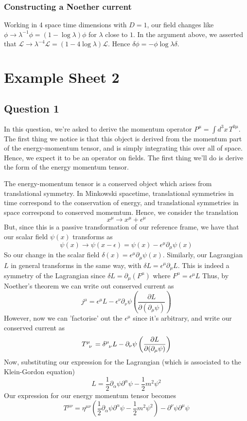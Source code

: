\documentclass[11pt, oneside]{article}   	%
\theoremstyle{newline}
\theoremstyle{newline}
\theoremstyle{newline}
\theoremstyle{newline}
\theoremstyle{newline}
\begin{document}
\subsubsection*{Constructing a Noether current} 
Working in 4 space time dimensions with $D = 1$, our field changes like $\phi \rightarrow \lambda^{ -1} \phi  = ( 1 - \log \lambda ) \phi$ for $\lambda $ close to $1$. In the argument above, we asserted that $\mathcal{ L} \rightarrow \lambda^{ - 4} \mathcal{L }  = ( 1  - 4 \log \lambda ) \mathcal{ L} $.  
Hence $\delta \phi  =  - \phi  \log \lambda \delta $.  
\pagebreak 
\section{Example Sheet 2} 
\subsection{Question 1} 

In this question, we're asked to derive the momentum operator $P^\mu = \int d^3x \, T^{ 0 \mu} $. The first thing we notice is that this object is derived from the momentum part of the energy-momentum tensor, and is simply integrating this over all of space. Hence, we expect it to be an operator on fields. The first thing we'll do is derive the form of the energy momentum tensor. 

The energy-momentum tensor is a conserved object which arises from translational symmetry. In Minkowski spacetime, translational symmetries in time correspond to the conservation of energy, and translational symmetries in space correspond to conserved momemtum. Hence, we consider the translation \[ x^\mu \rightarrow x^\mu + \epsilon^\mu \] 
But, since this is a passive transformation of our reference frame, we have that our scalar field $\psi(x)$  transforms as \[ \psi(x) \rightarrow \psi(x - \epsilon) = \psi(x)  - \epsilon^\mu \partial_\mu \psi( x) \] 
So our change in the scalar field $\delta( x) = \epsilon^\mu\partial_\mu \psi(x) $. Similarly, our Lagrangian $L$ in general transforms in the same way, with $\delta L = \epsilon^\mu \partial_\mu L $. This is indeed a symmetry of the Lagrangian since $\delta L = \partial_\mu ( F^\mu ) $ where $F^\mu = \epsilon^\mu L $ Thus, by Noether's theorem we can write out conserved current as 
\[ j^\mu = \epsilon^\mu L - \epsilon^\nu \partial_\nu \psi \left( \frac{ \partial L }{\partial ( \partial_\mu \psi) } \right) \]    
However, now we can 'factorise' out the $\epsilon^\mu$ since it's arbitrary, and write our conserved current as \[ T\indices{^\mu_\nu}  = \delta\indices{^\mu_\nu} L  - \partial_\nu \psi \left( \frac{ \partial L }{ \partial ( \partial_\mu \psi) } \right) \] 
Now, substituting our expression for the Lagrangian (which is associated to the Klein-Gordon equation) 
\[ L = \frac{1}{2} \partial_\alpha \psi \partial^\alpha \psi  - \frac{1}{2} m^2 \psi^2 \] 
Our expression for our energy momentum tensor becomes 
\[ T^{ \mu \nu} = \eta^{ \mu \nu} \left( \frac{ 1}{2} \partial_\alpha \psi \partial^\alpha \psi  - \frac{1}{2} m^2 \psi^2 \right)  - \partial^\nu \psi \partial^\mu \psi \] 
\end{document}
